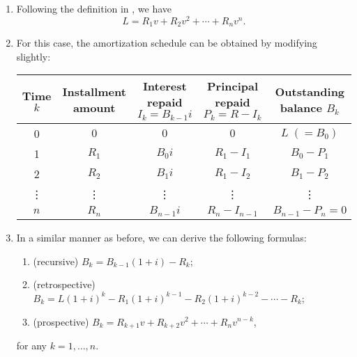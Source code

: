 \begin{enumerate}
\item Following the definition in , we have
\[
L=R_1v+R_2v^2+\dotsb+R_nv^n.
\]
\item For this case, the amortization schedule can be obtained by modifying
 slightly:
\begin{center}
\begin{tabular}{ccccc}
\toprule
Time \(k\)&Installment amount&
\makecell{Interest repaid\\ \(I_k=B_{k-1}i\)}&
\makecell{Principal repaid \\ \(P_k=R-I_k\)}&Outstanding balance \(B_k\) \\
\midrule
0&\(0\)&\(0\)&\(0\)&\(L\;(=B_0)\) \\
1&\(R_1\)&\(B_0i\)&\(R_1-I_1\)&\(B_0-P_1\) \\
2&\(R_2\)&\(B_1i\)&\(R_1-I_2\)&\(B_1-P_2\) \\
\vdots&\vdots&\vdots&\vdots&\vdots\\
\(n\)&\(R_n\)&\(B_{n-1}i\)&\(R_n-I_{n-1}\)&\(B_{n-1}-P_n=0\)\\
\bottomrule
\end{tabular}
\end{center}
\item In a similar manner as before, we can derive the following formulas:
\begin{enumerate}
\item (recursive) \(B_k=B_{k-1}(1+i)-R_k\);
\item (retrospective) \(B_k=L(1+i)^{k}-R_1(1+i)^{k-1}-R_2(1+i)^{k-2}-\dotsb-R_k\);
\item (prospective) \(B_k=R_{k+1}v+R_{k+2}v^2+\dotsb+R_nv^{n-k}\),
\end{enumerate}
for any \(k=1,\dotsc,n\).
\end{enumerate}
